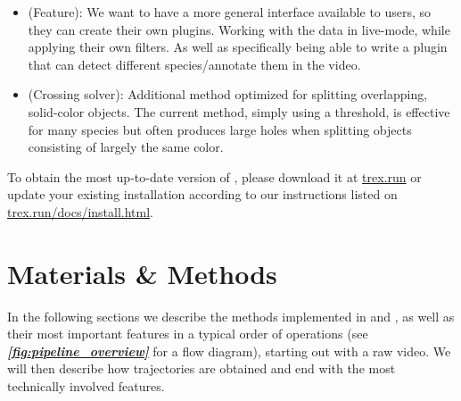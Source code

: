 \documentclass[9pt,lineno]{elife}
\newcommand{\figref}[1]{\textit{\textbf{\ref{#1}}}}
\newcommand{\TRex}{\protect\path{TRex}}
\newcommand{\TGrabs}{\protect\path{TGrabs}}
\begin{document}
\begin{itemize}
    \item (Feature): We want to have a more general interface available to users, so they can create their own plugins. Working with the data in live-mode, while applying their own filters. As well as specifically being able to write a plugin that can detect different species/annotate them in the video.
    \item (Crossing solver): Additional method optimized for splitting overlapping, solid-color objects. The current method, simply using a threshold, is effective for many species but often produces large holes when splitting objects consisting of largely the same color.
\end{itemize}

To obtain the most up-to-date version of \TRex{}, please download it at \href{https://trex.run}{trex.run} or update your existing installation according to our instructions listed on \href{https://trex.run/docs/install.html}{trex.run/docs/install.html}.

\section{Materials \& Methods}

{\color{blue}In the following sections we describe the methods implemented in \TRex{} and \TGrabs{}, as well as their most important features in a typical order of operations (see \figref{fig:pipeline_overview} for a flow diagram), starting out with a raw video. We will then describe how trajectories are obtained and end with the most technically involved features.}

\end{document}
